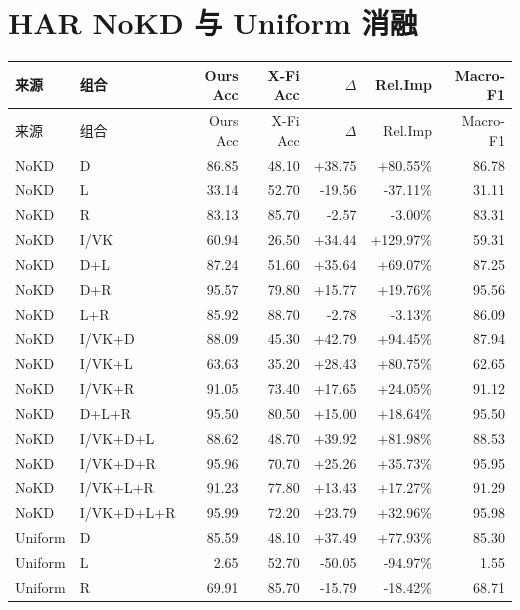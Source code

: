\documentclass[UTF8,10pt,a4paper]{ctexart}
\newcommand{\better}[1]{\textcolor{ImpBlue}{#1}}
\newcommand{\worse}[1]{\textcolor{DropRed}{#1}}
\begin{document}
\section{HAR NoKD 与 Uniform 消融}
{\tiny
\begin{longtable}{llrrrrr}
\toprule
来源 & 组合 & Ours Acc & X-Fi Acc & $\Delta$ & Rel.Imp & Macro-F1\\
\midrule
\endfirsthead
\toprule
来源 & 组合 & Ours Acc & X-Fi Acc & $\Delta$ & Rel.Imp & Macro-F1\\
\midrule
\endhead
NoKD & D & 86.85 & 48.10 & \better{+38.75} & \better{+80.55\%} & 86.78\\
NoKD & L & 33.14 & 52.70 & \worse{-19.56} & \worse{-37.11\%} & 31.11\\
NoKD & R & 83.13 & 85.70 & \worse{-2.57} & \worse{-3.00\%} & 83.31\\
NoKD & I/VK & 60.94 & 26.50 & \better{+34.44} & \better{+129.97\%} & 59.31\\
NoKD & D+L & 87.24 & 51.60 & \better{+35.64} & \better{+69.07\%} & 87.25\\
NoKD & D+R & 95.57 & 79.80 & \better{+15.77} & \better{+19.76\%} & 95.56\\
NoKD & L+R & 85.92 & 88.70 & \worse{-2.78} & \worse{-3.13\%} & 86.09\\
NoKD & I/VK+D & 88.09 & 45.30 & \better{+42.79} & \better{+94.45\%} & 87.94\\
NoKD & I/VK+L & 63.63 & 35.20 & \better{+28.43} & \better{+80.75\%} & 62.65\\
NoKD & I/VK+R & 91.05 & 73.40 & \better{+17.65} & \better{+24.05\%} & 91.12\\
NoKD & D+L+R & 95.50 & 80.50 & \better{+15.00} & \better{+18.64\%} & 95.50\\
NoKD & I/VK+D+L & 88.62 & 48.70 & \better{+39.92} & \better{+81.98\%} & 88.53\\
NoKD & I/VK+D+R & 95.96 & 70.70 & \better{+25.26} & \better{+35.73\%} & 95.95\\
NoKD & I/VK+L+R & 91.23 & 77.80 & \better{+13.43} & \better{+17.27\%} & 91.29\\
NoKD & I/VK+D+L+R & 95.99 & 72.20 & \better{+23.79} & \better{+32.96\%} & 95.98\\
Uniform & D & 85.59 & 48.10 & \better{+37.49} & \better{+77.93\%} & 85.30\\
Uniform & L & 2.65 & 52.70 & \worse{-50.05} & \worse{-94.97\%} & 1.55\\
Uniform & R & 69.91 & 85.70 & \worse{-15.79} & \worse{-18.42\%} & 68.71\\

\end{longtable}}
\end{document}
